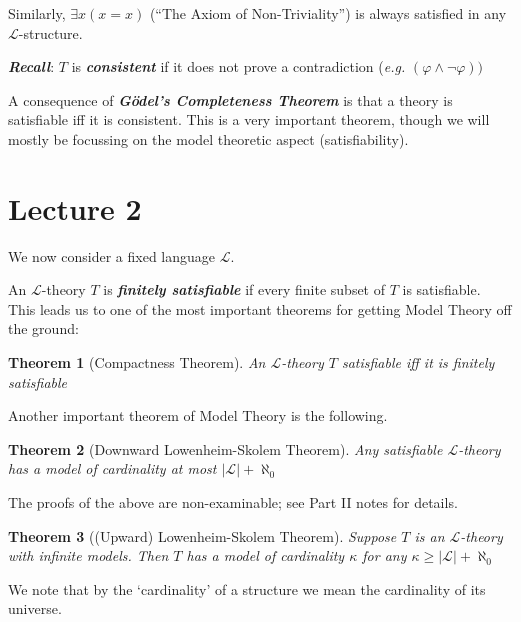 \documentclass[]{article}
\theoremstyle{custhm}
\theoremstyle{cusdef}
\theoremstyle{custhm}
\theoremstyle{custhm}
\theoremstyle{custhm}
\theoremstyle{ex}
\theoremstyle{custhm}
\newtheorem*{theorem*}{Theorem}
\theoremstyle{cusdef}
\theoremstyle{remark}
\theoremstyle{remark}
\theoremstyle{numremark}
\newcommand{\undf}[1]{\textit{\textbf{#1}}}
\renewcommand{\L}{\mathcal{L}}
\renewcommand{\it}[1]{\textit{#1}}
\renewcommand{\phi}{\varphi}
\renewcommand{\lnot}{\neg}
\begin{document}
Similarly, $\exists x(x=x)$ (``The Axiom of Non-Triviality'') is always satisfied in any $\L$-structure.

\undf{Recall}: $T$ is \undf{consistent} if it does not prove a contradiction (\it{e.g.} $(\phi\land\lnot\phi))$

A consequence of \undf{G{\"o}del's Completeness Theorem} is that a theory is satisfiable iff it is consistent. This is a very important theorem, though we will mostly be focussing on the model theoretic aspect (satisfiability).

\section{Lecture 2}

We now consider a fixed language $\L$.

An $\L$-theory $T$ is \undf{finitely satisfiable} if every finite subset of $T$ is satisfiable. This leads us to one of the most important theorems for getting Model Theory off the ground:

\begin{theorem*}[Compactness Theorem]
An $\L$-theory $T$ satisfiable iff it is finitely satisfiable
\end{theorem*}

Another important theorem of Model Theory is the following.

\begin{theorem*}[Downward Lowenheim-Skolem Theorem]
	Any satisfiable $\L$-theory has a model of cardinality at most $|\L|+\aleph_0$
\end{theorem*}

The proofs of the above are non-examinable; see Part II notes for details.

\begin{theorem*}[(Upward) Lowenheim-Skolem  Theorem]
Suppose $T$ is an $\L$-theory with infinite models. Then $T$ has a model of cardinality $\kappa$ for any $\kappa \ge |\L|+\aleph_0$
\end{theorem*}

We note that by the `cardinality' of a structure we mean the cardinality of its universe.
\end{document}
